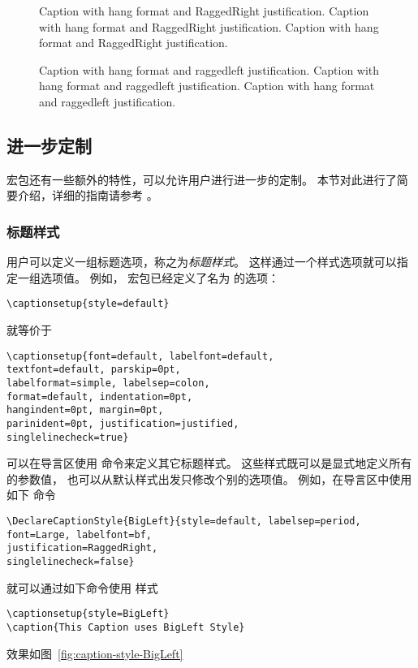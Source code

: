 \begin{figure}[tp]
\begin{minipage}{0.45\linewidth}
		\caption{Caption with hang format and RaggedRight justification.
			Caption with hang format and RaggedRight justification.
			Caption with hang format and RaggedRight justification.}
		\label{fig:caption-format-ex3-RaggedRight}
	\end{minipage}\hfill
	\begin{minipage}{0.45\linewidth}
		\usebox{\boxgraphictwo}
		\captionsetup{format=hang,indention=0pt,justification=raggedleft}
		\caption{Caption with hang format and raggedleft justification.
			Caption with hang format and raggedleft justification.
			Caption with hang format and raggedleft justification.}
		\label{fig:caption-format-ex3-raggedleft}
	\end{minipage}
\end{figure}


\subsection{进一步定制}\label{ssec:furthercustom}

 宏包还有一些额外的特性，可以允许用户进行进一步的定制。
本节对此进行了简要介绍，详细的指南请参考 \cite{caption-doc}。

\subsubsection{标题样式}\label{sssec:caption-style}

用户可以定义一组标题选项，称之为\emph{标题样式}。
这样通过一个样式选项就可以指定一组选项值。
例如， 宏包已经定义了名为  的选项：
\begin{lstlisting}
\captionsetup{style=default}
\end{lstlisting}
就等价于
\begin{lstlisting}
\captionsetup{font=default, labelfont=default,
textfont=default, parskip=0pt,
labelformat=simple, labelsep=colon,
format=default, indentation=0pt,
hangindent=0pt, margin=0pt,
parinident=0pt, justification=justified,
singlelinecheck=true}
\end{lstlisting}
可以在导言区使用  命令来定义其它标题样式。
这些样式既可以是显式地定义所有的参数值，
也可以从默认样式出发只修改个别的选项值。
例如，在导言区中使用如下  命令
\begin{lstlisting}
\DeclareCaptionStyle{BigLeft}{style=default, labelsep=period,
font=Large, labelfont=bf,
justification=RaggedRight,
singlelinecheck=false}
\end{lstlisting}
就可以通过如下命令使用  样式
\begin{lstlisting}
\captionsetup{style=BigLeft}
\caption{This Caption uses BigLeft Style}
\end{lstlisting}
效果如图~\ref{fig:caption-style-BigLeft}

